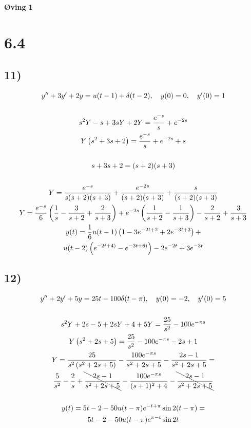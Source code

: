 \begin{center}
	\LARGE{\textbf{Øving 1}}
\end{center}


\section*{6.4}

\subsection*{11)}

\begin{gather*}
	y'' + 3 y' + 2 y = u(t - 1) + \delta(t - 2), \quad
	y(0) = 0, \quad
	y'(0) = 1 \\ \\
	s^2 Y - s + 3 s Y + 2 Y = \frac{e^{-s}}{s} + e^{-2 s} \\
	Y \left( s^2 + 3 s + 2 \right) = \frac{e^{-s}}{s} + e^{-2 s} + s \\ \\
	s + 3 s + 2 = (s + 2) (s + 3) \\ \\
	Y = \frac{e^{-s}}{s (s + 2) (s + 3)} +
	\frac{e^{-2 s}}{(s + 2) (s + 3)} +
	\frac{s}{(s + 2) (s + 3)} \\
	Y = \frac{e^{-s}}{6} \left( \frac{1}{s} - \frac{3}{s + 2} + \frac{2}{s + 3} \right) +
	e^{-2 s} \left( \frac{1}{s + 2} - \frac{1}{s + 3} \right) -
	\frac{2}{s + 2} + \frac{3}{s + 3} \\
	y(t) = \frac{1}{6} u(t - 1) \left( 1 - 3 e^{-2 t + 2} + 2 e^{-3 t + 3} \right) + \\
	u(t - 2) \left( e^{-2 t + 4)} - e^{-3 t + 6)} \right) -
	2 e^{-2 t} + 3 e^{-3 t}
\end{gather*}


\subsection*{12)}


\begin{gather*}
	y'' + 2 y' + 5 y = 25 t - 100 \delta (t - \pi), \quad
	y(0) = -2, \quad
	y'(0) = 5 \\ \\
	s^2 Y + 2 s - 5 + 2 s Y + 4 + 5Y = \frac{25}{s^2} - 100 e^{-\pi s} \\
	Y \left( s^2 + 2 s + 5 \right) =
	\frac{25}{s^2} - 100 e^{-\pi s} - 2 s + 1 \\
	Y = \frac{25}{s^2 \left( s^2 + 2 s + 5 \right)} -
	\frac{100 e^{-\pi s}}{s^2 + 2 s + 5} -
	\frac{2 s - 1}{s^2 + 2 s + 5} = \\
	\frac{5}{s^2} - \frac{2}{s} + \bcancel{\frac{2 s - 1}{s^2 + 2 s + 5}} -
	\frac{100 e^{-\pi s}}{(s + 1)^2 + 4} -
	\bcancel{\frac{2 s - 1}{s^2 + 2 s + 5}} \\ \\
	y(t) = 5 t - 2 - 50 u(t - \pi) e^{-t + \pi} \sin{2(t - \pi)} =\\
	5 t - 2 - 50 u(t - \pi) e^{\pi - t} \sin{2 t}
\end{gather*}


